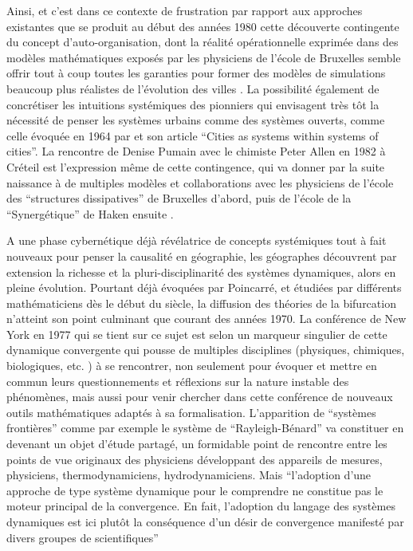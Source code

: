 Ainsi, et c'est dans ce contexte de frustration par rapport aux approches existantes  que se produit au début des années 1980 cette découverte contingente du concept d'auto-organisation, dont la réalité opérationnelle exprimée dans des modèles mathématiques exposés par les physiciens de l'école de Bruxelles semble offrir tout à coup toutes les garanties pour former des modèles de simulations beaucoup plus réalistes de l'évolution des villes  \autocite[350]{Pumain1998a}. La possibilité également de concrétiser les intuitions systémiques des pionniers qui envisagent très tôt la nécessité de penser les systèmes urbains comme des systèmes ouverts, comme celle évoquée en 1964 par \textcite{Berry1964a} et son article \enquote{Cities as systems within systems of cities}. La rencontre de Denise Pumain avec le chimiste Peter Allen en 1982 à Créteil  est l'expression même de cette contingence, qui va donner par la suite naissance à de multiples modèles et collaborations avec les physiciens de l'école des \enquote{structures dissipatives} de Bruxelles d'abord, puis de l'école de la \enquote{Synergétique} de Haken ensuite \autocites[27]{Pumain2003}{Pumain1982b, Mathieu2014,Sanders1984, Sanders1992}.

A une phase cybernétique déjà révélatrice de concepts systémiques tout à fait nouveaux pour penser la causalité en géographie, les géographes découvrent par extension la richesse et la pluri-disciplinarité des systèmes dynamiques, alors en pleine évolution. Pourtant déjà évoquées par Poincarré, et étudiées par différents mathématiciens dès le début du siècle, la diffusion des théories de la bifurcation n'atteint son point culminant que courant des années 1970. La conférence de New York en 1977 qui se tient sur ce sujet est selon \textcite{Dahan1991} un marqueur singulier de cette dynamique convergente qui pousse de multiples disciplines (physiques, chimiques, biologiques, etc. ) à se rencontrer, non seulement pour évoquer et mettre en commun leurs questionnements et réflexions sur la nature instable des phénomènes, mais aussi pour venir chercher dans cette conférence de nouveaux outils mathématiques adaptés à sa formalisation. L'apparition de \enquote{systèmes frontières} comme par exemple le système de \enquote{Rayleigh-Bénard} va constituer en devenant un objet d'étude partagé, un formidable point de rencontre entre les points de vue originaux des physiciens développant des appareils de mesures, physiciens, thermodynamiciens, hydrodynamiciens. Mais \enquote{l’adoption d’une approche de type système dynamique pour le comprendre ne constitue pas le moteur principal de la convergence. En fait, l’adoption du langage des systèmes dynamiques est ici plutôt la conséquence d’un désir de convergence manifesté par divers groupes de scientifiques} \textcite{Dahan1991}

